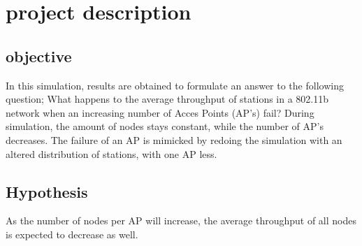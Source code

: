 \chapter{project description}

\section{objective} 

In this simulation, results are obtained to formulate an answer to the following question; 
What happens to the average throughput of stations in a 802.11b network when an increasing number of Acces Points (AP's) fail? 
During simulation, the amount of nodes stays constant, while the number of AP's decreases. The failure of an AP is mimicked by 
redoing the simulation with an altered distribution of stations, with one AP less. 

\section{Hypothesis}
As the number of nodes per AP will increase, the average throughput of all nodes is expected to decrease as well.  